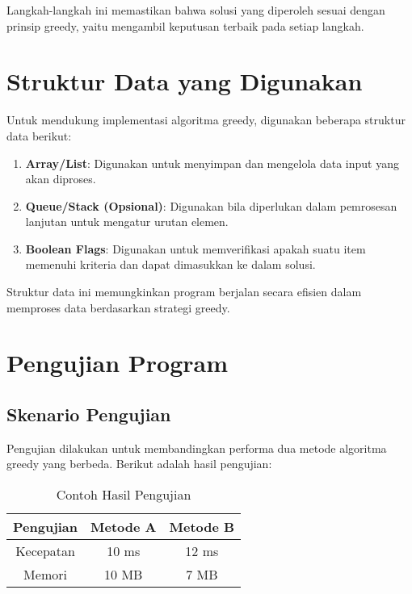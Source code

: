 Langkah-langkah ini memastikan bahwa solusi yang diperoleh sesuai dengan prinsip greedy, yaitu mengambil keputusan terbaik pada setiap langkah.

\section{Struktur Data yang Digunakan} \label{IV.Struktur Data}

Untuk mendukung implementasi algoritma greedy, digunakan beberapa struktur data berikut:

\begin{enumerate}
    \item \textbf{Array/List}: Digunakan untuk menyimpan dan mengelola data input yang akan diproses.
    \item \textbf{Queue/Stack (Opsional)}: Digunakan bila diperlukan dalam pemrosesan lanjutan untuk mengatur urutan elemen.
    \item \textbf{Boolean Flags}: Digunakan untuk memverifikasi apakah suatu item memenuhi kriteria dan dapat dimasukkan ke dalam solusi.
\end{enumerate}

Struktur data ini memungkinkan program berjalan secara efisien dalam memproses data berdasarkan strategi greedy.

\section{Pengujian Program} \label{IV.Pengujian Program}

\subsection{Skenario Pengujian}

Pengujian dilakukan untuk membandingkan performa dua metode algoritma greedy yang berbeda. Berikut adalah hasil pengujian:

\vspace{1em} %
\begin{longtable}{|c|c|c|}
	\caption{Contoh Hasil Pengujian}
	\label{table:4.}\\
	\hline
	\textbf{Pengujian} & \textbf{Metode A} & \textbf{Metode B} \\
	\hline
	\endhead
	Kecepatan & 10 ms & 12 ms \\ 
	\hline
	Memori & 10 MB & 7 MB \\
	\hline
\end{longtable}
\vspace{1em} %


